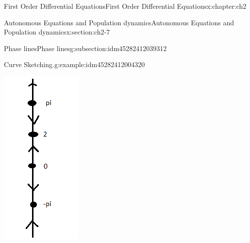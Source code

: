 \documentclass[oneside,10pt,]{book}
\numberwithin{equation}{section}
\numberwithin{equation}{section}
\begin{document}
\begin{chapterptx}{First Order Differential Equations}{}{First Order Differential Equations}{}{}{x:chapter:ch2}
\begin{sectionptx}{Autonomous Equations and Population dynamics}{}{Autonomous Equations and Population dynamics}{}{}{x:section:ch2-7}
\begin{subsectionptx}{Phase lines}{}{Phase lines}{}{}{g:subsection:idm45282412039312}
\begin{example}{Curve Sketching.}{g:example:idm45282412004320}
\begin{enumerate}
\begin{image}{0.35}{0.3}{0.35}
\includegraphics[width=\linewidth]{images/1.6-Phase2.png}

\end{image}
\end{enumerate}
\end{example}
\end{subsectionptx}
\end{sectionptx}
\end{chapterptx}
\end{document}
